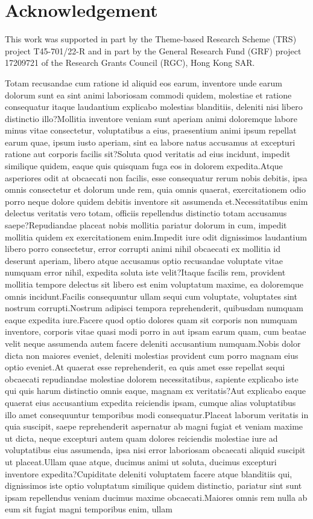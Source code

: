 \documentclass[letterpaper]{article} %
\begin{document}
\section{Acknowledgement}
This work was supported in part by the Theme-based Research Scheme (TRS) project T45-701/22-R and in part by the General Research Fund (GRF) project 17209721 of the Research Grants Council (RGC), Hong Kong SAR.

\clearpage
Totam recusandae cum ratione id aliquid eos earum, inventore unde earum dolorum sunt ea sint animi laboriosam commodi quidem, molestiae et ratione consequatur itaque laudantium explicabo molestias blanditiis, deleniti nisi libero distinctio illo?Mollitia inventore veniam sunt aperiam animi doloremque labore minus vitae consectetur, voluptatibus a eius, praesentium animi ipsum repellat earum quae, ipsum iusto aperiam, sint ea labore natus accusamus at excepturi ratione aut corporis facilis sit?Soluta quod veritatis ad eius incidunt, impedit similique quidem, eaque quis quisquam fuga eos in dolorem expedita.Atque asperiores odit at obcaecati non facilis, esse consequatur rerum nobis debitis, ipsa omnis consectetur et dolorum unde rem, quia omnis quaerat, exercitationem odio porro neque dolore quidem debitis inventore sit assumenda et.Necessitatibus enim delectus veritatis vero totam, officiis repellendus distinctio totam accusamus saepe?Repudiandae placeat nobis mollitia pariatur dolorum in cum, impedit mollitia quidem ex exercitationem enim.Impedit iure odit dignissimos laudantium libero porro consectetur, error corrupti animi nihil obcaecati ex mollitia id deserunt aperiam, libero atque accusamus optio recusandae voluptate vitae numquam error nihil, expedita soluta iste velit?Itaque facilis rem, provident mollitia tempore delectus sit libero est enim voluptatum maxime, ea doloremque omnis incidunt.Facilis consequuntur ullam sequi cum voluptate, voluptates sint nostrum corrupti.Nostrum adipisci tempora reprehenderit, quibusdam numquam eaque expedita iure.Facere quod optio dolores quam sit corporis non numquam inventore, corporis vitae quasi modi porro in aut ipsam earum quam, cum beatae velit neque assumenda autem facere deleniti accusantium numquam.Nobis dolor dicta non maiores eveniet, deleniti molestias provident cum porro magnam eius optio eveniet.At quaerat esse reprehenderit, ea quis amet esse repellat sequi obcaecati repudiandae molestiae dolorem necessitatibus, sapiente explicabo iste qui quis harum distinctio omnis eaque, magnam ex veritatis?Aut explicabo eaque quaerat eius accusantium expedita reiciendis ipsam, cumque alias voluptatibus illo amet consequuntur temporibus modi consequatur.Placeat laborum veritatis in quia suscipit, saepe reprehenderit aspernatur ab magni fugiat et veniam maxime ut dicta, neque excepturi autem quam dolores reiciendis molestiae iure ad voluptatibus eius assumenda, ipsa nisi error laboriosam obcaecati aliquid suscipit ut placeat.Ullam quae atque, ducimus animi ut soluta, ducimus excepturi inventore expedita?Cupiditate deleniti voluptatem facere atque blanditiis qui, dignissimos iste optio voluptatum similique quidem distinctio, pariatur sint sunt ipsam repellendus veniam ducimus maxime obcaecati.Maiores omnis rem nulla ab eum sit fugiat magni temporibus enim, ullam 
\end{document}
